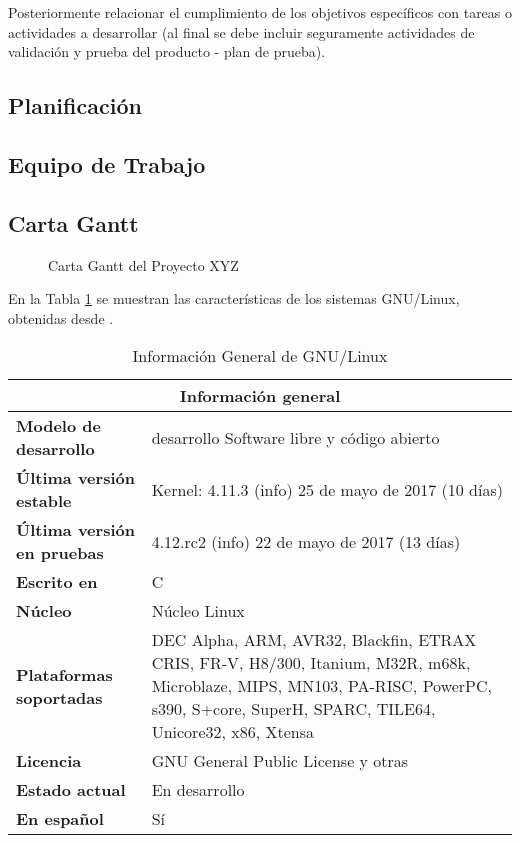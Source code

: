 \documentclass[letter,12pt]{report}
\begin{document}
Posteriormente relacionar el cumplimiento de los objetivos específicos con tareas o actividades a desarrollar (al final se debe incluir seguramente actividades de validación y prueba del producto - plan de prueba).

\subsection{Planificación}



\subsection{Equipo de Trabajo}


\begin{landscape}
\subsection{Carta Gantt}\label{sec:gantt}
\begin{figure}[hbt]
  \centering
  \caption{Carta Gantt del Proyecto XYZ}
  \label{gantt}
\end{figure}
\end{landscape}







En la Tabla \ref{t:info} se muestran las características de los sistemas GNU/Linux, obtenidas desde \cite{001}.


\begin{table}[hbt]
\begin{center}
\begin{tabular}{|l|p{10cm}|}\hline
\multicolumn{2}{|c|}{\textbf{Información general}}\\
\hline
\textbf{Modelo de desarrollo}&desarrollo	Software libre y código abierto\\
\textbf{Última versión estable}&Kernel: 4.11.3 (info) 25 de mayo de 2017 (10 días)\\
\textbf{Última versión en pruebas}&	4.12.rc2 (info) 22 de mayo de 2017 (13 días)\\
\textbf{Escrito en}&	C\\
\textbf{Núcleo}&	Núcleo Linux\\
\textbf{Plataformas soportadas}	& DEC Alpha, ARM, AVR32, Blackfin, ETRAX CRIS, FR-V, H8/300, Itanium, M32R, m68k, Microblaze, MIPS, MN103, PA-RISC, PowerPC, s390, S+core, SuperH, SPARC, TILE64, Unicore32, x86, Xtensa\\
\textbf{Licencia}	&GNU General Public License y otras\\
\textbf{Estado actual}	&En desarrollo\\
\textbf{En español}	&Sí\\
\hline
\end{tabular}
\end{center}
\caption{Información General de GNU/Linux}
\label{t:info}
\end{table}
\end{document}
